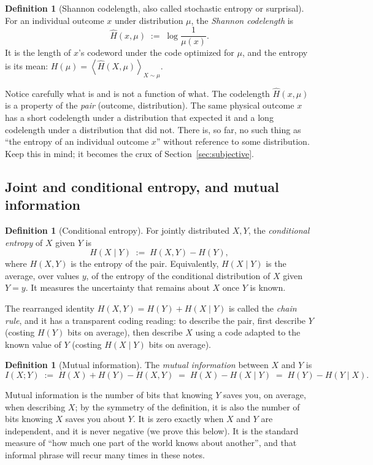 \documentclass[10pt]{article}
\theoremstyle{definition}
\newtheorem{definition}[theorem]{Definition}
\theoremstyle{remark}
\newcommand{\E}[1]{\left\langle #1 \right\rangle}
\begin{document}
\begin{definition}[Shannon codelength, also called stochastic entropy or surprisal]
\label{def:codelength}
For an individual outcome $x$ under distribution $\mu$, the \emph{Shannon codelength} is
\[
\hat H(x, \mu) \;:=\; \log \frac{1}{\mu(x)} .
\]
It is the length of $x$'s codeword under the code optimized for $\mu$, and the entropy is its mean: $H(\mu) = \E{\hat H(X,\mu)}_{X \sim \mu}$.
\end{definition}

Notice carefully what is and is not a function of what. The codelength $\hat H(x, \mu)$ is a property of the \emph{pair} (outcome, distribution). The same physical outcome $x$ has a short codelength under a distribution that expected it and a long codelength under a distribution that did not. There is, so far, no such thing as ``the entropy of an individual outcome $x$'' without reference to some distribution. Keep this in mind; it becomes the crux of Section~\ref{sec:subjective}.

\subsection{Joint and conditional entropy, and mutual information}

\begin{definition}[Conditional entropy]
For jointly distributed $X, Y$, the \emph{conditional entropy} of $X$ given $Y$ is
\[
H(X \mid Y) \;:=\; H(X, Y) - H(Y),
\]
where $H(X,Y)$ is the entropy of the pair. Equivalently, $H(X \mid Y)$ is the average, over values $y$, of the entropy of the conditional distribution of $X$ given $Y = y$. It measures the uncertainty that remains about $X$ once $Y$ is known.
\end{definition}

The rearranged identity $H(X,Y) = H(Y) + H(X \mid Y)$ is called the \emph{chain rule}, and it has a transparent coding reading: to describe the pair, first describe $Y$ (costing $H(Y)$ bits on average), then describe $X$ using a code adapted to the known value of $Y$ (costing $H(X \mid Y)$ bits on average).

\begin{definition}[Mutual information]
\label{def:mi}
The \emph{mutual information} between $X$ and $Y$ is
\[
I(X;Y) \;:=\; H(X) + H(Y) - H(X,Y) \;=\; H(X) - H(X \mid Y) \;=\; H(Y) - H(Y \mid X).
\]
\end{definition}

Mutual information is the number of bits that knowing $Y$ saves you, on average, when describing $X$; by the symmetry of the definition, it is also the number of bits knowing $X$ saves you about $Y$. It is zero exactly when $X$ and $Y$ are independent, and it is never negative (we prove this below). It is the standard measure of ``how much one part of the world knows about another'', and that informal phrase will recur many times in these notes.
\end{document}
